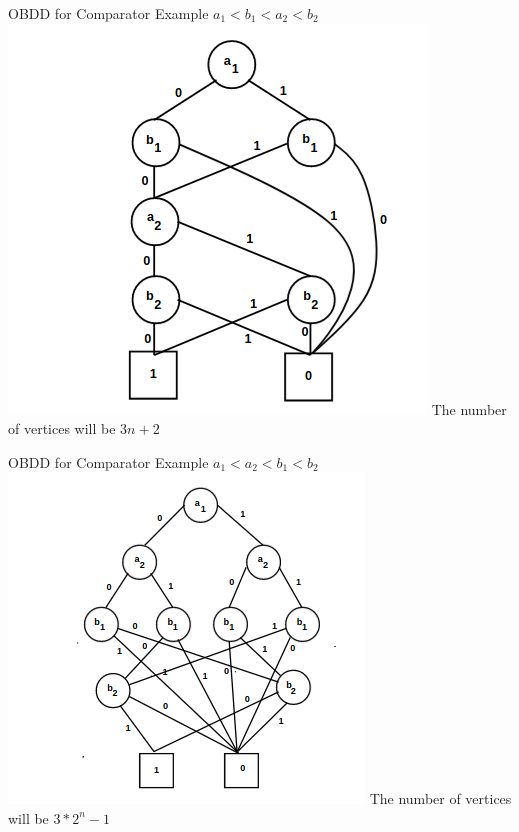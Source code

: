 \documentclass{beamer}
\begin{document}
\begin{frame}{OBDD for Comparator Example}
$a_1 < b_1 < a_2 < b_2$\newline
\includegraphics[scale=0.5]{comp1.png}\newline
The number of vertices will be $3n + 2$
\end{frame}

\begin{frame}{OBDD for Comparator Example}
$a_1 < a_2 < b_1 < b_2$\newline
\includegraphics[scale=0.5]{comp2.png}\newline
The number of vertices will be $3*2^n - 1$
\end{frame}
\end{document}
